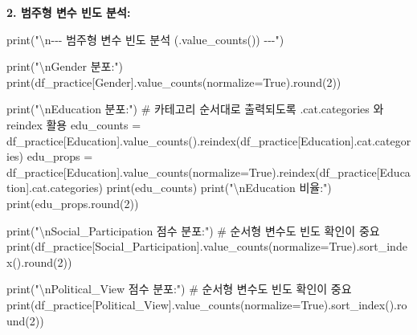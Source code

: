 \documentclass[
  letterpaper,
]{book}
\newenvironment{Shaded}{\begin{snugshade}}{\end{snugshade}}
\newcommand{\BuiltInTok}[1]{\textcolor[rgb]{0.00,0.23,0.31}{#1}}
\newcommand{\CharTok}[1]{\textcolor[rgb]{0.13,0.47,0.30}{#1}}
\newcommand{\CommentTok}[1]{\textcolor[rgb]{0.37,0.37,0.37}{#1}}
\newcommand{\DecValTok}[1]{\textcolor[rgb]{0.68,0.00,0.00}{#1}}
\newcommand{\NormalTok}[1]{\textcolor[rgb]{0.00,0.23,0.31}{#1}}
\newcommand{\OperatorTok}[1]{\textcolor[rgb]{0.37,0.37,0.37}{#1}}
\newcommand{\StringTok}[1]{\textcolor[rgb]{0.13,0.47,0.30}{#1}}
\newcommand{\VariableTok}[1]{\textcolor[rgb]{0.07,0.07,0.07}{#1}}
\begin{document}
\textbf{2. 범주형 변수 빈도 분석:}

\begin{Shaded}
\begin{Highlighting}[]
\BuiltInTok{print}\NormalTok{(}\StringTok{"}\CharTok{\textbackslash{}n}\StringTok{{-}{-}{-} 범주형 변수 빈도 분석 (.value\_counts()) {-}{-}{-}"}\NormalTok{)}

\BuiltInTok{print}\NormalTok{(}\StringTok{"}\CharTok{\textbackslash{}n}\StringTok{Gender 분포:"}\NormalTok{)}
\BuiltInTok{print}\NormalTok{(df\_practice[}\StringTok{\textquotesingle{}Gender\textquotesingle{}}\NormalTok{].value\_counts(normalize}\OperatorTok{=}\VariableTok{True}\NormalTok{).}\BuiltInTok{round}\NormalTok{(}\DecValTok{2}\NormalTok{))}

\BuiltInTok{print}\NormalTok{(}\StringTok{"}\CharTok{\textbackslash{}n}\StringTok{Education 분포:"}\NormalTok{)}
\CommentTok{\# 카테고리 순서대로 출력되도록 .cat.categories 와 reindex 활용}
\NormalTok{edu\_counts }\OperatorTok{=}\NormalTok{ df\_practice[}\StringTok{\textquotesingle{}Education\textquotesingle{}}\NormalTok{].value\_counts().reindex(df\_practice[}\StringTok{\textquotesingle{}Education\textquotesingle{}}\NormalTok{].cat.categories)}
\NormalTok{edu\_props }\OperatorTok{=}\NormalTok{ df\_practice[}\StringTok{\textquotesingle{}Education\textquotesingle{}}\NormalTok{].value\_counts(normalize}\OperatorTok{=}\VariableTok{True}\NormalTok{).reindex(df\_practice[}\StringTok{\textquotesingle{}Education\textquotesingle{}}\NormalTok{].cat.categories)}
\BuiltInTok{print}\NormalTok{(edu\_counts)}
\BuiltInTok{print}\NormalTok{(}\StringTok{"}\CharTok{\textbackslash{}n}\StringTok{Education 비율:"}\NormalTok{)}
\BuiltInTok{print}\NormalTok{(edu\_props.}\BuiltInTok{round}\NormalTok{(}\DecValTok{2}\NormalTok{))}

\BuiltInTok{print}\NormalTok{(}\StringTok{"}\CharTok{\textbackslash{}n}\StringTok{Social\_Participation 점수 분포:"}\NormalTok{) }\CommentTok{\# 순서형 변수도 빈도 확인이 중요}
\BuiltInTok{print}\NormalTok{(df\_practice[}\StringTok{\textquotesingle{}Social\_Participation\textquotesingle{}}\NormalTok{].value\_counts(normalize}\OperatorTok{=}\VariableTok{True}\NormalTok{).sort\_index().}\BuiltInTok{round}\NormalTok{(}\DecValTok{2}\NormalTok{))}

\BuiltInTok{print}\NormalTok{(}\StringTok{"}\CharTok{\textbackslash{}n}\StringTok{Political\_View 점수 분포:"}\NormalTok{) }\CommentTok{\# 순서형 변수도 빈도 확인이 중요}
\BuiltInTok{print}\NormalTok{(df\_practice[}\StringTok{\textquotesingle{}Political\_View\textquotesingle{}}\NormalTok{].value\_counts(normalize}\OperatorTok{=}\VariableTok{True}\NormalTok{).sort\_index().}\BuiltInTok{round}\NormalTok{(}\DecValTok{2}\NormalTok{))}
\end{Highlighting}
\end{Shaded}
\end{document}
